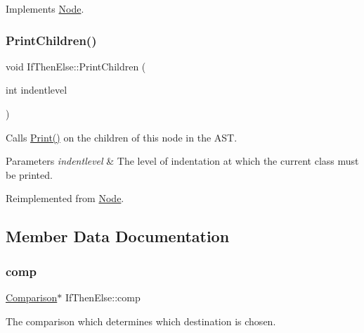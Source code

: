 Implements \hyperlink{class_node_a56e29657306ffb004d69c6929ae44269}{Node}.

\mbox{\label{class_if_then_else_a868f2a8cc77bd5512ea54edaf81aa004}} 
\subsubsection{\texorpdfstring{Print\+Children()}{PrintChildren()}}
{\footnotesize\ttfamily void If\+Then\+Else\+::\+Print\+Children (\begin{DoxyParamCaption}\item[{int}]{indentlevel }\end{DoxyParamCaption})\hspace{0.3cm}{\ttfamily [virtual]}}

Calls \hyperlink{class_node_a9ef727fd72d1a37792b3db60a8a479dd}{Print()} on the children of this node in the A\+ST. 
\begin{DoxyParams}{Parameters}
{\em indentlevel} & The level of indentation at which the current class must be printed. \\
\hline
\end{DoxyParams}


Reimplemented from \hyperlink{class_node_a3e67ec8d22182b721717af14fe0c3000}{Node}.



\subsection{Member Data Documentation}
\mbox{\label{class_if_then_else_a4a1ba1f798d5682dbb1006cda209d325}} 
\subsubsection{\texorpdfstring{comp}{comp}}
{\footnotesize\ttfamily \hyperlink{class_comparison}{Comparison}$\ast$ If\+Then\+Else\+::comp\hspace{0.3cm}{\ttfamily [protected]}}

The comparison which determines which destination is chosen. \mbox{\label{class_if_then_else_a46474bc5e459898beef1eaf8456adb9d}} 

